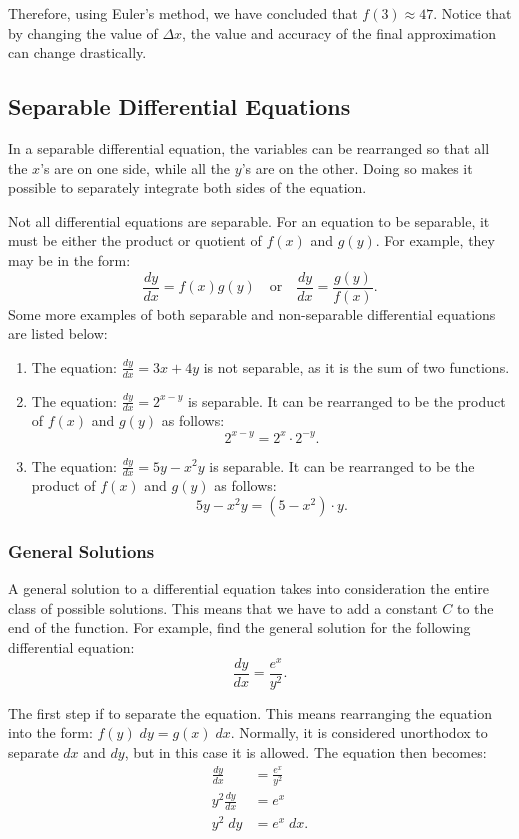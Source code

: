 \begin{enumerate}
	Therefore, using Euler's method, we have concluded that $f(3) \approx 47$. Notice that by changing the value of $\Delta x$, the value and accuracy of the final approximation can change drastically.
\end{enumerate}

\subsection{Separable Differential Equations}
In a separable differential equation, the variables can be rearranged so that all the $x$'s are on one side, while all the $y$'s are on the other. Doing so makes it possible to separately integrate both sides of the equation.

Not all differential equations are separable. For an equation to be separable, it must be either the product or quotient of $f(x)$ and $g(y)$. For example, they may be in the form:
\[ \frac{dy}{dx} = f(x) g(y) \quad \text{or} \quad \frac{dy}{dx} = \frac{g(y)}{f(x)}. \]
Some more examples of both separable and non-separable differential equations are listed below:
\begin{enumerate}
	\item The equation: $\frac{dy}{dx} = 3x + 4y$ is not separable, as it is the sum of two functions.
	\item The equation: $\frac{dy}{dx} = 2^{x - y}$ is separable. It can be rearranged to be the product of $f(x)$ and $g(y)$ as follows:
	\[ 2^{x - y} = 2^x \cdot 2^{-y}. \]
	\item The equation: $\frac{dy}{dx} = 5y - x^2 y$ is separable. It can be rearranged to be the product of $f(x)$ and $g(y)$ as follows:
	\[ 5y - x^2 y = (5 - x^2) \cdot y. \]
\end{enumerate}

\subsubsection{General Solutions}
A general solution to a differential equation takes into consideration the entire class of possible solutions. This means that we have to add a constant $C$ to the end of the function. For example, find the general solution for the following differential equation:
\[ \frac{dy}{dx} = \frac{e^x}{y^2}. \]

\noindent The first step if to separate the equation. This means rearranging the equation into the form: $f(y) \; dy = g(x) \; dx$. Normally, it is considered unorthodox to separate $dx$ and $dy$, but in this case it is allowed. The equation then becomes:
\begin{align*}
	\frac{dy}{dx} &= \frac{e^x}{y^2} \\[5pt]
	y^2 \frac{dy}{dx} &= e^x \\[5pt]
	y^2 \; dy &= e^x \; dx.
\end{align*}


